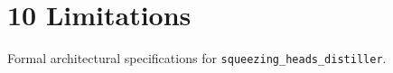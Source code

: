 \section{10 Limitations}

Formal architectural specifications for \texttt{squeezing_heads_distiller}.
